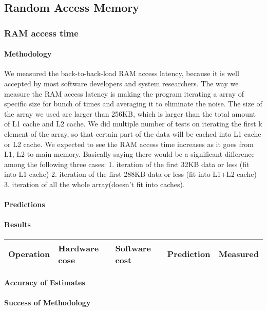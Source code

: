 \subsection{Random Access Memory}

\subsubsection{RAM access time}
\paragraph{Methodology}
We measured the back-to-back-load RAM access latency, because it is well accepted by most software developers and system researchers. The way we measure the RAM access latency is making the program iterating a array of specific size for bunch of times and averaging it to eliminate the noise. The size of the array we used are larger than 256KB, which is larger than the total amount of L1 cache and L2 cache. We did multiple number of tests on iterating the first k element of the array, so that certain part of the data will be cached into L1 cache or L2 cache.
We expected to see the RAM access time increases as it goes from L1, L2 to main memory. Basically saying there would be a significant difference among the following three cases: 
1. iteration of the first 32KB data or less (fit into L1 cache)
2. iteration of the first 288KB data or less (fit into L1+L2 cache)
3. iteration of all the whole array(doesn’t fit into caches).
\paragraph{Predictions}
\paragraph{Results}

\begin{center}
\begin{tabular}{| l | l | l | l | l |}
\hline
Operation & Hardware cose & Software cost & Prediction & Measured \\
\hline
\end{tabular}
\end{center}

\paragraph{Accuracy of Estimates}
\paragraph{Success of Methodology}

